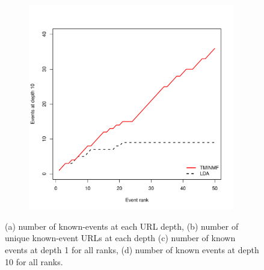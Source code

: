\documentclass{sig-alternate}
\begin{document}
\begin{figure}[!ht]
\begin{subfigure}{.5\textwidth}
\end{subfigure}%
\begin{subfigure}{.5\textwidth}
  \centering
\includegraphics[width=9cm]{plots/events_at_rank_10.pdf}
\end{subfigure}
\caption{(a) number of known-events at each URL depth, (b) number of unique known-event URLs at each depth (c) number of known events at depth 1 for all ranks, (d) number of known events at depth 10 for all ranks.}
\label{fig.eventdist}
\end{figure}
\end{document}
